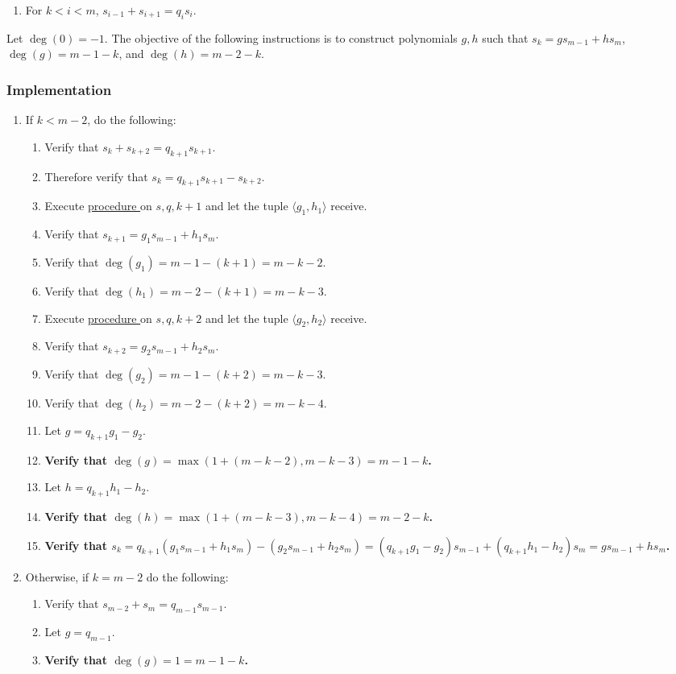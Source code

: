 \documentclass{article}
\newcounter{procedure}[part]
\newcommand{\implementation}{\subsubsection*{Implementation}}
\newcommand{\procedurehr}[1]{\hyperref[sec:procedure #1]{procedure \expandafter\csname procedure#1\endcsname}}
\begin{document}
\begin{multicols}{2}
\begin{enumerate}
					\item For $k<i<m$, $s_{i-1}+s_{i+1}=q_is_i$.
				\end{enumerate}
				Let $\deg(0)=-1$. The objective of the following instructions is to construct polynomials $g,h$ such that $s_k=gs_{m-1}+hs_m$, $\deg(g)=m-1-k$, and $\deg(h)=m-2-k$.
			\implementation
				\begin{enumerate}
					\item If $k<m-2$, do the following:
					\begin{enumerate}
						\item Verify that $s_k+s_{k+2}=q_{k+1}s_{k+1}$.
						\item Therefore verify that $s_k=q_{k+1}s_{k+1}-s_{k+2}$.
						\item Execute \procedurehr{2.26} on $s,q,k+1$ and let the tuple $\langle g_1,h_1\rangle$ receive.
						\item Verify that $s_{k+1}=g_1s_{m-1}+h_1s_m$.
						\item Verify that $\deg(g_1)=m-1-(k+1)=m-k-2$.
						\item Verify that $\deg(h_1)=m-2-(k+1)=m-k-3$.
						\item Execute \procedurehr{2.26} on $s,q,k+2$ and let the tuple $\langle g_2,h_2\rangle$ receive.
						\item Verify that $s_{k+2}=g_2s_{m-1}+h_2s_m$.
						\item Verify that $\deg(g_2)=m-1-(k+2)=m-k-3$.
						\item Verify that $\deg(h_2)=m-2-(k+2)=m-k-4$.
						\item Let $g=q_{k+1}g_1-g_2$.
						\item \textbf{Verify that $\deg(g)=\max(1+(m-k-2),m-k-3)=m-1-k$.}
						\item Let $h=q_{k+1}h_1-h_2$.
						\item \textbf{Verify that $\deg(h)=\max(1+(m-k-3),m-k-4)=m-2-k$.}
						\item \textbf{Verify that $s_k=q_{k+1}(g_1s_{m-1}+h_1s_m)-(g_2s_{m-1}+h_2s_m)=(q_{k+1}g_1-g_2)s_{m-1}+(q_{k+1}h_1-h_2)s_m=gs_{m-1}+hs_m$.}
					\end{enumerate}
					\item Otherwise, if $k=m-2$ do the following:
					\begin{enumerate}
						\item Verify that $s_{m-2}+s_m=q_{m-1}s_{m-1}$.
						\item Let $g=q_{m-1}$.
						\item \textbf{Verify that $\deg(g)=1=m-1-k$.}

\end{enumerate}
\end{enumerate}
\end{multicols}
\end{document}
